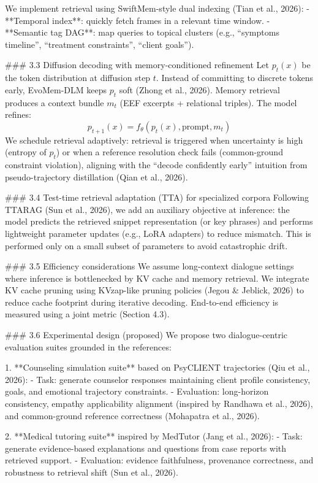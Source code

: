 We implement retrieval using SwiftMem-style dual indexing (Tian et al., 2026):
- **Temporal index**: quickly fetch frames in a relevant time window.
- **Semantic tag DAG**: map queries to topical clusters (e.g., “symptoms timeline”, “treatment constraints”, “client goals”).

### 3.3 Diffusion decoding with memory-conditioned refinement  
Let \(p_t(x)\) be the token distribution at diffusion step \(t\). Instead of committing to discrete tokens early, EvoMem-DLM keeps \(p_t\) soft (Zhong et al., 2026). Memory retrieval produces a context bundle \(m_t\) (EEF excerpts + relational triples). The model refines:
\[
p_{t+1}(x) = f_\theta(p_t(x), \text{prompt}, m_t)
\]
We schedule retrieval adaptively: retrieval is triggered when uncertainty is high (entropy of \(p_t\)) or when a reference resolution check fails (common-ground constraint violation), aligning with the “decode confidently early” intuition from pseudo-trajectory distillation (Qian et al., 2026).

### 3.4 Test-time retrieval adaptation (TTA) for specialized corpora  
Following TTARAG (Sun et al., 2026), we add an auxiliary objective at inference: the model predicts the retrieved snippet representation (or key phrases) and performs lightweight parameter updates (e.g., LoRA adapters) to reduce mismatch. This is performed only on a small subset of parameters to avoid catastrophic drift.

### 3.5 Efficiency considerations  
We assume long-context dialogue settings where inference is bottlenecked by KV cache and memory retrieval. We integrate KV cache pruning using KVzap-like pruning policies (Jegou & Jeblick, 2026) to reduce cache footprint during iterative decoding. End-to-end efficiency is measured using a joint metric (Section 4.3).

### 3.6 Experimental design (proposed)  
We propose two dialogue-centric evaluation suites grounded in the references:

1. **Counseling simulation suite** based on PsyCLIENT trajectories (Qiu et al., 2026):  
   - Task: generate counselor responses maintaining client profile consistency, goals, and emotional trajectory constraints.
   - Evaluation: long-horizon consistency, empathy applicability alignment (inspired by Randhawa et al., 2026), and common-ground reference correctness (Mohapatra et al., 2026).

2. **Medical tutoring suite** inspired by MedTutor (Jang et al., 2026):  
   - Task: generate evidence-based explanations and questions from case reports with retrieved support.
   - Evaluation: evidence faithfulness, provenance correctness, and robustness to retrieval shift (Sun et al., 2026).

